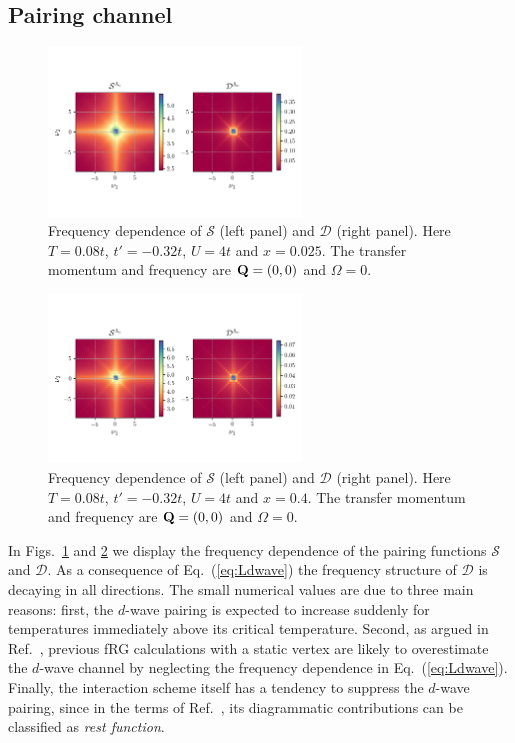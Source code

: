 \subsection{Pairing channel}
\label{sec:appPairingChannel}
\begin{figure}
\includegraphics[width=0.60\textwidth]{images/Phi_color_s_d_wave_SE_fill0_975.png}
\caption{Frequency dependence of $\mathcal{S}$ (left panel) and $\mathcal{D}$ (right panel). Here $T=0.08t$, $t'=-0.32t$, $U=4t$ and $x=0.025$. The transfer momentum and frequency are $\mathbf{Q}=(0,0)$ and $\Omega=0$.}
\label{fig:pairing975}
\end{figure}
\begin{figure}
\includegraphics[width=0.60\textwidth]{images/Phi_color_s_d_wave_SE_fill0_600.png}
\caption{Frequency dependence of $\mathcal{S}$ (left panel) and $\mathcal{D}$ (right panel). Here $T=0.08t$, $t'=-0.32t$, $U=4t$ and $x=0.4$. The transfer momentum and frequency are $\mathbf{Q}=(0,0)$ and $\Omega=0$.}
\label{fig:pairing600}
\end{figure}
In Figs.~\ref{fig:pairing975} and \ref{fig:pairing600} we display the frequency dependence of the pairing functions $\mathcal{S}$ and $\mathcal{D}$. 
As a consequence of Eq.~(\ref{eq:Ldwave}) the frequency structure of $\mathcal{D}$ is decaying in all directions.\cite{Wentzell2016}
The small numerical values are due to three main reasons: 
first, the $d$-wave pairing is expected to increase suddenly for temperatures immediately above its critical temperature. 
Second, as argued in Ref.~, previous fRG calculations with a static vertex are likely to overestimate the $d$-wave channel by neglecting the frequency dependence in Eq.~(\ref{eq:Ldwave}). 
Finally, the interaction scheme itself has a tendency to suppress the $d$-wave pairing, since in the terms of Ref.~, its diagrammatic contributions can be classified as \emph{rest function}.
 
